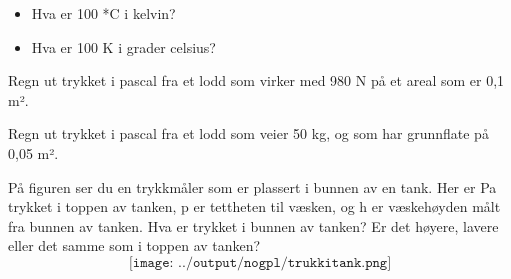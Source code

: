 \documentclass[12pt,a4paper]{article}
\def\oppgave{
		}
\begin{document}
\begin{itemize}
	\item Hva er 100 *C i kelvin?
	\item Hva er 100 K i grader celsius?

\end{itemize}
\vskip 5pt 
\vskip 2.5pt 
\oppgave{}%
\vskip 2.5pt 
Regn ut trykket i pascal fra et lodd som virker med 980 N på et areal som er 0,1 m².
\vskip 5pt 
\vskip 2.5pt 
\oppgave{}%
\vskip 2.5pt 
Regn ut trykket i pascal fra et lodd som veier 50 kg, og som har grunnflate på 0,05 m².

\vskip 5pt 
\vskip 2.5pt 
\oppgave{}%
\vskip 2.5pt 
På figuren ser du en trykkmåler som er plassert i bunnen av en tank. Her er Pa trykket i toppen av tanken, p er tettheten til væsken, og h er væskehøyden målt fra bunnen av tanken. Hva er trykket i bunnen av tanken? Er det høyere, lavere eller det samme som i toppen av tanken?\\

$$\texttt{[image: ../output/nogpl/trukkitank.png]}$$
\vskip 5pt 
\vskip 2.5pt 
\end{document}
